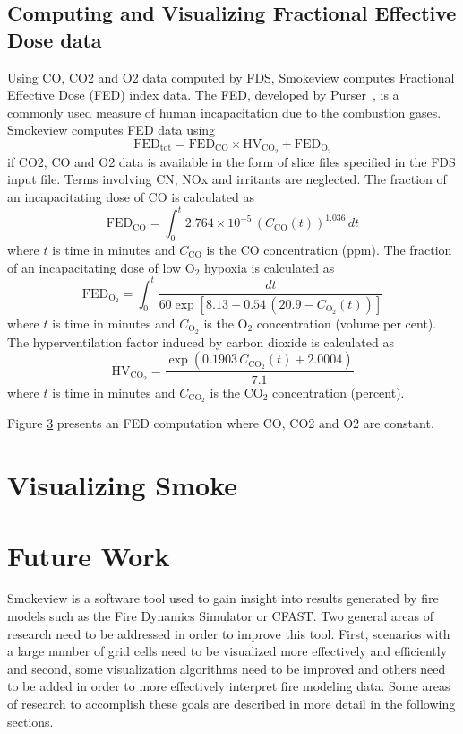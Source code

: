 \documentclass[11pt,twoside]{book}
\newcommand{\be}{\begin{equation}}
\newcommand{\ee}{\end{equation}}
\begin{document}
\section{Computing and Visualizing Fractional Effective Dose data}
Using CO, CO2 and O2 data computed by FDS, Smokeview computes Fractional Effective Dose (FED) index data.
The FED, developed by Purser~\cite{SFPE:Purser}, is a commonly used measure of human incapacitation
due to the combustion gases. Smokeview computes FED data using
\be
\mathrm{FED}_\mathrm{tot} = \mathrm{FED}_\mathrm{CO} \times \mathrm{HV}_\mathrm{CO_2} + \mathrm{FED}_\mathrm{O_2}
\ee
if CO2, CO and O2 data is available in the form of slice files specified in the FDS input file. Terms involving CN, NOx and irritants
are neglected.  The fraction of an incapacitating dose of CO is calculated as
\be
\mathrm{FED}_\mathrm{CO} = \int_0^t 2.764 \times 10^{-5} \, (C_\mathrm{CO}(t))^{1.036} \, dt
\ee
where $t$ is time in minutes and $C_\mathrm{CO}$ is the CO concentration (ppm).
The fraction of an incapacitating dose of low O${}_2$ hypoxia is calculated as
\be
\mathrm{FED}_\mathrm{O_2} =  \int_0^t \frac{dt}{60 \exp \left [ 8.13 - 0.54 \, (20.9 - C_\mathrm{O_2}(t)) \right ] }
\ee
where $t$ is time in minutes and $C_\mathrm{O_2}$ is the O${}_2$ concentration (volume per cent).
The hyperventilation factor induced by carbon dioxide is calculated as
\be
\mathrm{HV}_\mathrm{CO_2} = \frac{ \exp( 0.1903 \, C_\mathrm{CO_2}(t) +  2.0004 ) }{7.1} \label{co2hyp}
\ee
where $t$ is time in minutes and $C_\mathrm{CO_2}$ is the CO${}_2$ concentration (percent).

Figure \ref{} presents an FED computation where CO, CO2 and O2 are constant.

%
%

\chapter{Visualizing Smoke}

\newcommand{\citesmv}{\cite{Smokeview_Users_Guide}}
\newcommand{\paper}{chapter}

%
%

\chapter{Future Work}

Smokeview is a software tool used to gain insight into results
generated by fire models such as the Fire Dynamics Simulator or
CFAST. Two general areas of research need to be addressed in order
to improve this tool. First, scenarios with a large number of grid
cells need to be visualized more effectively and efficiently and
second, some visualization algorithms need to be improved and
others need to be added in order to more effectively interpret
fire modeling data. Some areas of research to accomplish these
goals are described in more detail in the following sections.
\end{document}
